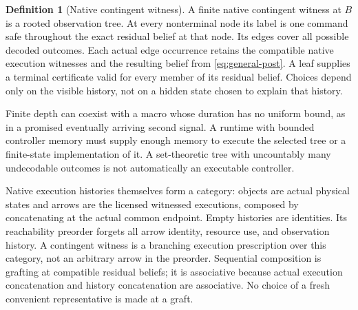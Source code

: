 \documentclass[11pt]{article}
\theoremstyle{definition}
\newtheorem{definition}[theorem]{Definition}
\theoremstyle{remark}
\begin{document}
\begin{definition}[Native contingent witness]\label{def:native-policy}
A finite native contingent witness at $B$ is a rooted observation tree.
At every nonterminal node its label is one command safe throughout the
exact residual belief at that node. Its edges cover all possible decoded
outcomes. Each actual edge occurrence retains the compatible native
execution witnesses and the resulting belief from
\eqref{eq:general-post}. A leaf supplies a terminal certificate valid for
every member of its residual belief. Choices depend only on the visible
history, not on a hidden state chosen to explain that history.
\end{definition}
Finite depth can coexist with a macro whose duration has no uniform bound,
as in a promised eventually arriving second signal. A runtime with bounded
controller memory must supply enough memory to execute the selected tree
or a finite-state implementation of it. A set-theoretic tree with
uncountably many undecodable outcomes is not automatically an executable
controller.

Native execution histories themselves form a category: objects are actual
physical states and arrows are the licensed witnessed executions,
composed by concatenating at the actual common endpoint. Empty histories
are identities. Its reachability preorder forgets all arrow identity,
resource use, and observation history. A contingent witness is a branching
execution prescription over this category, not an arbitrary arrow in the
preorder. Sequential composition is grafting at compatible residual
beliefs; it is associative because actual execution concatenation and
history concatenation are associative. No choice of a fresh convenient
representative is made at a graft.
\end{document}

